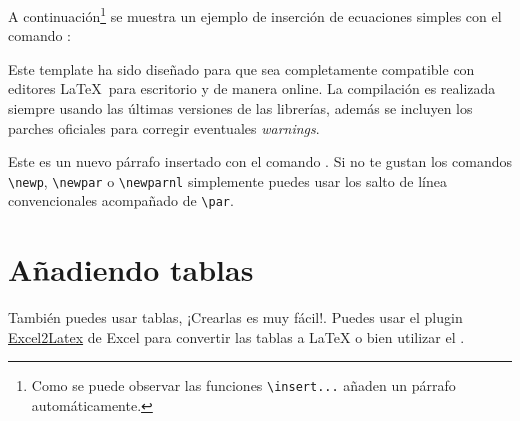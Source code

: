 
	A continuación\footnote{Como se puede observar las funciones \texttt{\textbackslash insert...} añaden un párrafo automáticamente.} se muestra un ejemplo de inserción de ecuaciones simples con el comando \href{https://latex.ppizarror.com/informe.html#hlp-formulae}{}:


	Este template ha sido diseñado para que sea completamente compatible con editores \LaTeX\ para escritorio y de manera online. La compilación es realizada siempre usando las últimas versiones de las librerías, además se incluyen los parches oficiales para corregir eventuales \textit{warnings}.

	\newp Este es un nuevo párrafo insertado con el comando \href{https://latex.ppizarror.com/informe.html#hlp-parrafo}{}. Si no te gustan los comandos \texttt{\textbackslash newp}, \texttt{\textbackslash newpar} o \texttt{\textbackslash newparnl} simplemente puedes usar los salto de línea convencionales acompañado de \texttt{\textbackslash par}.
	
	\newp \lipsum[4]
	
	\newp \lipsum[11]

\section{Añadiendo tablas}

	También puedes usar tablas, ¡Crearlas es muy fácil!. Puedes usar el plugin \href{https://www.ctan.org/tex-archive/support/excel2latex/}{Excel2Latex} \cite{excel2latex} de Excel para convertir las tablas a \LaTeX\xspace o bien utilizar el  \cite{tablesgenerator}.

